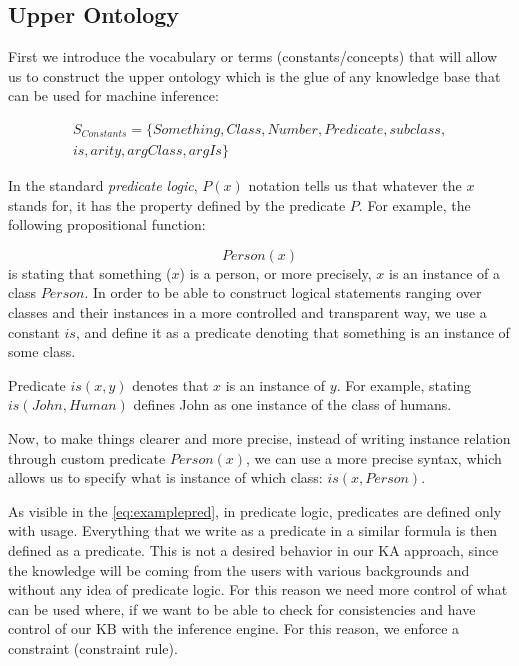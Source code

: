 \subsection{Upper Ontology}
\label{section:upperOnto}
First we introduce the vocabulary or terms (constants/concepts) that will allow 
us to construct the upper ontology which is the glue of any knowledge base that 
can be used for machine inference:

\begin{equation}\label{set:terms}
\begin{gathered}
S_{Constants} = \{Something, Class, Number, Predicate, subclass, \\
	is, arity, argClass, argIs\}
\end{gathered}
\end{equation}

In the standard \emph{predicate logic}, $P(x)$ notation tells us that whatever 
the $x$ stands for, it has the property defined by the predicate $P$. 
For example, the following propositional function:

\begin{equation}\label{eq:examplepred}
Person(x)
\end{equation}
is stating that something ($x$) is a person, or more precisely, $x$ is an 
instance of a class $Person$. In order to be able to construct logical 
statements ranging
over classes and their instances in a more controlled and transparent way, we
use a constant $is$, and define it as a predicate denoting that something is an
instance of some class.

\begin{definition}[predicate "$is$"]
\label{const:is}
Predicate $is(x,y)$ denotes that $x$ is an instance of $y$. For example, 
stating $is(John, Human)$ defines John as one instance of the class of humans.
\end{definition}
Now, to make things clearer and more precise, instead of writing instance
relation through custom predicate $Person(x)$, we can use a more precise syntax, which allows us to specify what is instance of which class: $is(x,Person)$.

As visible in the \autoref{eq:examplepred}, in predicate logic, predicates are
defined only with usage. Everything that we write as a predicate in a similar
formula is then defined as a predicate. This is not a desired behavior in our 
KA approach, since the knowledge will be coming from the users with various
backgrounds and without any idea of predicate logic. For this reason we
need more control of what can be used where, if we want to be able to
check for consistencies and have control of our KB with the inference engine.
For this reason, we enforce a constraint (constraint rule).


